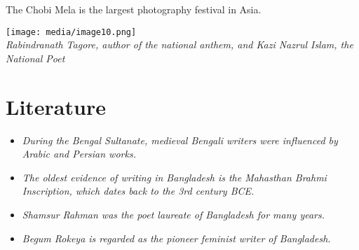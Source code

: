 The Chobi Mela is the largest photography festival in Asia.

\texttt{[image: media/image10.png]}\\
\emph{Rabindranath Tagore, author of the national anthem, and Kazi
Nazrul Islam, the National Poet}

\section{Literature}\label{literature}

\begin{itemize}
\item
  \emph{During the Bengal Sultanate, medieval Bengali writers were
  influenced by Arabic and Persian works.}
\item
  \emph{The oldest evidence of writing in Bangladesh is the Mahasthan
  Brahmi Inscription, which dates back to the 3rd century BCE.}
\item
  \emph{Shamsur Rahman was the poet laureate of Bangladesh for many
  years.}
\item
  \emph{Begum Rokeya is regarded as the pioneer feminist writer of
  Bangladesh.}
\end{itemize}

